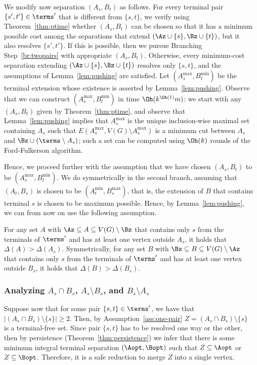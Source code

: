 We modify now separation $(A_s,B_t)$ as follows. For every terminal pair $\{s',t'\}\in \terms'$ that is different from $\{s,t\}$, we verify using Theorem~\ref{thm:ptime} whether $(A_s,B_t)$ can be chosen so that it has a minimum possible cost among the separations that extend $(\Az\cup \{s\},\Bz\cup \{t\})$, but it also resolves $\{s',t'\}$. If this is possible, then we pursue Branching Step~\ref{br:twopairs} with appropriate $(A_s,B_t)$. Otherwise, every minimum-cost separation extending $(\Az\cup \{s\},\Bz\cup \{t\})$ resolves only $\{s,t\}$, and the assumptions of Lemma~\ref{lem:pushing} are satisfied.
Let $(A_s^{\max},B_t^{\min})$ be the terminal extension whose existence is asserted by Lemma~\ref{lem:pushing}.
Observe that we can construct $(A_s^{\max},B_t^{\min})$ in time $\Oh(k^{\Oh(1)} m)$:
we start with any $(A_s,B_t)$ given by Theorem~\ref{thm:ptime},
and observe that Lemma~\ref{lem:pushing} implies that $A_s^{\max}$ is the unique inclusion-wise maximal set
containing $A_s$ such that $E(A_s^{\max},V(G) \setminus A_s^{\max})$ is a minimum cut between $A_s$ and $\Bz \cup (\terms \setminus A_s)$;
such a set can be computed using $\Oh(k)$ rounds of the Ford-Fulkerson algorithm.
  
Hence, we proceed further with the assumption that we have chosen $(A_s,B_t)$ to be $(A_s^{\max},B_t^{\min})$. We do symmetrically in the second branch, assuming that $(A_t,B_s)$ is chosen to be $(A_t^{\min},B_s^{\max})$, that is, the extension of $B$ that contains terminal $s$ is chosen to be maximum possible. Hence, by Lemma~\ref{lem:pushing}, we can from now on use the following assumption.

\begin{assumption}\label{ass:pushing}
For any set $A$ with $\Az\subseteq A\subseteq V(G)\setminus \Bz$ that contains only $s$ from the terminals of $\terms'$ and has at least one vertex outside $A_s$, it holds that $\Delta(A)>\Delta(A_s)$. Symmetrically, for any set $B$ with $\Bz\subseteq B\subseteq V(G)\setminus \Az$ that contains only $s$ from the terminals of $\terms'$ and has at least one vertex outside $B_s$, it holds that $\Delta(B)>\Delta(B_s)$. 
\end{assumption}

\subsubsection{Analyzing $A_s\cap B_s$, $A_s\setminus B_s$, and $B_s\setminus A_s$}

Suppose now that for some pair $\{s,t\}\in \terms'$, we have that $|(A_s\cap B_s)\setminus \{s\}|\geq 2$. Then, by Assumption~\ref{ass:one-pair} $Z=(A_s\cap B_s)\setminus \{s\}$ is a terminal-free set. Since pair $\{s,t\}$ has to be resolved one way or the other, then by persistence (Theorem~\ref{thm:persistence}) we infer that there is some minimum integral terminal separation $(\Aopt,\Bopt)$ such that $Z\subseteq \Aopt$ or $Z\subseteq \Bopt$. Therefore, it is a safe reduction to merge $Z$ into a single vertex.

